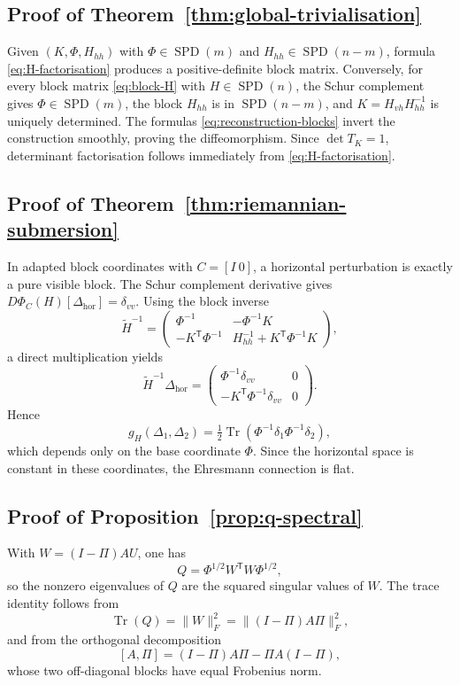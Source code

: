 \documentclass[11pt,a4paper]{article}
\numberwithin{equation}{section}
\DeclareMathOperator{\Tr}{Tr}
\DeclareMathOperator{\SPD}{SPD}
\theoremstyle{thmcompact}
\theoremstyle{remark}
\begin{document}
\subsection*{Proof of Theorem~\ref{thm:global-trivialisation}}
Given $(K,\Phi,H_{hh})$ with $\Phi\in\SPD(m)$ and $H_{hh}\in\SPD(n-m)$, formula \eqref{eq:H-factorisation} produces a positive-definite block matrix. Conversely, for every block matrix \eqref{eq:block-H} with $H\in\SPD(n)$, the Schur complement gives $\Phi\in\SPD(m)$, the block $H_{hh}$ is in $\SPD(n-m)$, and $K=H_{vh}H_{hh}^{-1}$ is uniquely determined. The formulas \eqref{eq:reconstruction-blocks} invert the construction smoothly, proving the diffeomorphism. Since $\det T_K=1$, determinant factorisation follows immediately from \eqref{eq:H-factorisation}.

\subsection*{Proof of Theorem~\ref{thm:riemannian-submersion}}
In adapted block coordinates with $C=[I\ 0]$, a horizontal perturbation is exactly a pure visible block. The Schur complement derivative gives $D\Phi_C(H)[\Delta_{\mathrm{hor}}]=\delta_{vv}$. Using the block inverse
\[
\widetilde H^{-1}=
\begin{pmatrix}
\Phi^{-1} & -\Phi^{-1}K\\
-K^{\mathsf T}\Phi^{-1} & H_{hh}^{-1}+K^{\mathsf T}\Phi^{-1}K
\end{pmatrix},
\]
a direct multiplication yields
\[
\widetilde H^{-1}\Delta_{\mathrm{hor}}=
\begin{pmatrix}
\Phi^{-1}\delta_{vv} & 0\\
-K^{\mathsf T}\Phi^{-1}\delta_{vv} & 0
\end{pmatrix}.
\]
Hence
\[
g_H(\Delta_1,\Delta_2)=\tfrac12\Tr(\Phi^{-1}\delta_1\Phi^{-1}\delta_2),
\]
which depends only on the base coordinate $\Phi$. Since the horizontal space is constant in these coordinates, the Ehresmann connection is flat.

\subsection*{Proof of Proposition~\ref{prop:q-spectral}}
With $W=(I-\Pi)AU$, one has
\[
Q=\Phi^{1/2}W^{\mathsf T}W\Phi^{1/2},
\]
so the nonzero eigenvalues of $Q$ are the squared singular values of $W$. The trace identity follows from
\[
\Tr(Q)=\|W\|_F^2=\|(I-\Pi)A\Pi\|_F^2,
\]
and from the orthogonal decomposition
\[
[A,\Pi]=(I-\Pi)A\Pi-\Pi A(I-\Pi),
\]
whose two off-diagonal blocks have equal Frobenius norm.
\end{document}
